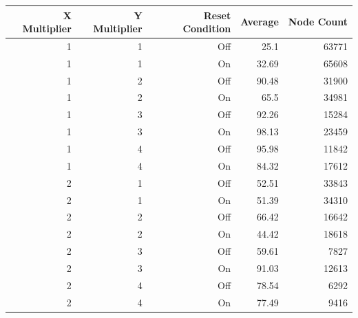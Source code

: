 \documentclass[12pt,letterpaper]{article}
\begin{document}
\begin{table}[h]
\begin{tabular}{rrrrr}

X Multiplier & Y Multiplier & Reset Condition &    Average & Node Count \\
\hline
         1 &          1 &        Off &       25.1 &      63771 \\

         1 &          1 &         On &      32.69 &      65608 \\

         1 &          2 &        Off &      90.48 &      31900 \\

         1 &          2 &         On &       65.5 &      34981 \\

         1 &          3 &        Off &      92.26 &      15284 \\

         1 &          3 &         On &      98.13 &      23459 \\

         1 &          4 &        Off &      95.98 &      11842 \\

         1 &          4 &         On &      84.32 &      17612 \\

         2 &          1 &        Off &      52.51 &      33843 \\

         2 &          1 &         On &      51.39 &      34310 \\

         2 &          2 &        Off &      66.42 &      16642 \\

         2 &          2 &         On &      44.42 &      18618 \\

         2 &          3 &        Off &      59.61 &       7827 \\

         2 &          3 &         On &      91.03 &      12613 \\

         2 &          4 &        Off &      78.54 &       6292 \\

         2 &          4 &         On &      77.49 &       9416 \\


\end{tabular}
\end{table}
\end{document}
